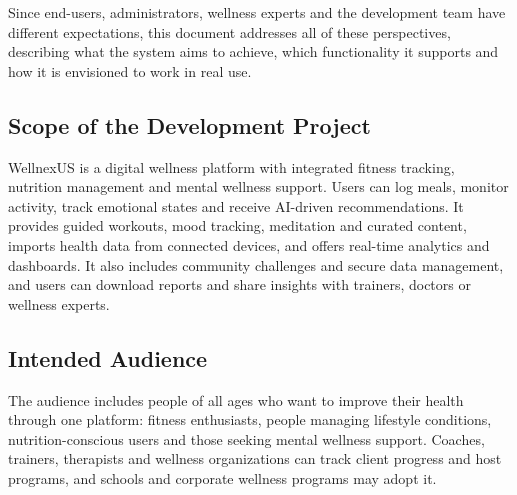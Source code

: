 \documentclass[11pt,a4paper]{report}
\begin{document}
Since end-users, administrators, wellness experts and the development team have different expectations, this document addresses all of these perspectives, describing what the system aims to achieve, which functionality it supports and how it is envisioned to work in real use.

\subsection{Scope of the Development Project}
WellnexUS is a digital wellness platform with integrated fitness tracking, nutrition management and mental wellness support. Users can log meals, monitor activity, track emotional states and receive AI-driven recommendations. It provides guided workouts, mood tracking, meditation and curated content, imports health data from connected devices, and offers real-time analytics and dashboards. It also includes community challenges and secure data management, and users can download reports and share insights with trainers, doctors or wellness experts.

\subsection{Intended Audience}
The audience includes people of all ages who want to improve their health through one platform: fitness enthusiasts, people managing lifestyle conditions, nutrition-conscious users and those seeking mental wellness support. Coaches, trainers, therapists and wellness organizations can track client progress and host programs, and schools and corporate wellness programs may adopt it.
\end{document}
